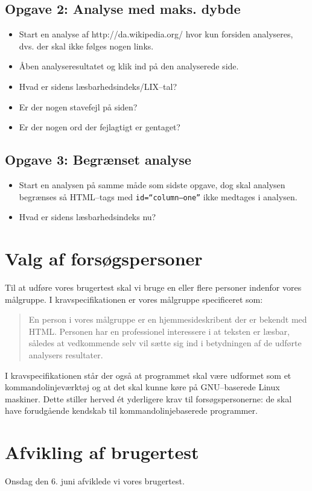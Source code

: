 \documentclass[a4paper,oneside,article]{memoir}
\begin{document}
\subsection{Opgave 2: Analyse med maks. dybde}
\begin{itemize}
\item Start en analyse af http://da.wikipedia.org/ hvor kun forsiden
  analyseres, dvs. der skal ikke følges nogen links.
\item Åben analyseresultatet og klik ind på den analyserede side.
\item Hvad er sidens læsbarhedsindeks/LIX--tal?
\item Er der nogen stavefejl på siden?
\item Er der nogen ord der fejlagtigt er gentaget?
\end{itemize}

\subsection{Opgave 3: Begrænset analyse}
\begin{itemize}
\item Start en analysen på samme måde som sidste opgave, dog skal
  analysen begrænses så HTML--tags med \texttt{id=``column--one''} ikke
  medtages i analysen.
\item Hvad er sidens læsbarhedsindeks nu?
\end{itemize}
\newpage
\section{Valg af forsøgspersoner}
Til at udføre vores brugertest skal vi bruge en eller flere personer
indenfor vores målgruppe. I kravspecifikationen er vores målgruppe
specificeret som:
\begin{quote}
En person i vores målgruppe er en hjemmesideskribent der er bekendt
med HTML. Personen har en professionel interessere i at teksten er
læsbar, således at vedkommende selv vil sætte sig ind i betydningen af
de udførte analysers resultater.
\end{quote}

I kravspecifikationen står der også at programmet skal være udformet
som et kommandolinjeværktøj og at det skal kunne køre på GNU--baserede
Linux maskiner. Dette stiller herved ét yderligere krav til
forsøgspersonerne: de skal have forudgående kendskab til
kommando\-linje\-baserede programmer.

\section{Afvikling af brugertest}
Onsdag den 6. juni afviklede vi vores brugertest.
\end{document}
